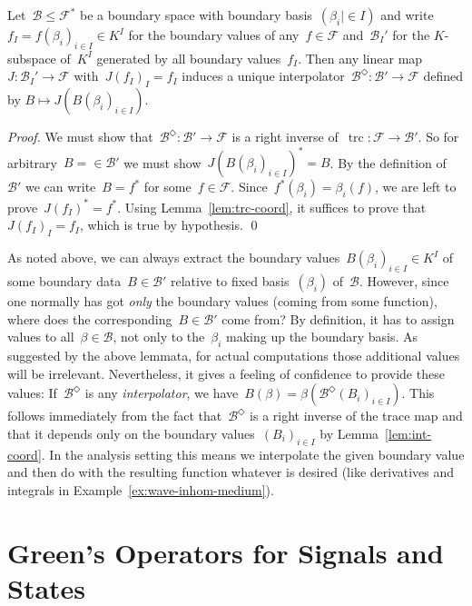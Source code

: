 \documentclass[a4paper]{llncs}
\newcommand{\fri}[1]{#1^\Diamond}
\newcommand{\trc}{\operatorname{trc}}
\newcommand{\galg}{\mathcal{F}}
\newcommand{\bspc}{\mathcal{B}}
\newenvironment{myproof}{\begin{proof}}{\qed\end{proof}}
\begin{document}
\begin{mylemma}
  \label{lem:int-coord}
  Let~$\bspc \le \galg^*$ be a boundary space with boundary
  basis~$(\beta_i \mid \in I)$ and write~$f_I = f(\beta_i)_{i \in I}
  \in K^I$ for the boundary values of any~$f \in \galg$
  and~$\bspc_I'$ for the $K$-subspace of~$K^I$ generated by all
  boundary values~$f_I$. Then any linear map~$J\colon \bspc_I' \to
  \galg$ with~$J(f_I)_I = f_I$ induces a unique
  interpolator~$\fri{\bspc}\colon \bspc' \to \galg$ defined by
  $B \mapsto J(B(\beta_i)_{i \in I})$.
\end{mylemma}
\begin{myproof}
  We must show that~$\fri{\bspc}\colon \bspc' \to \galg$ is a right inverse
  of~$\trc\colon \galg \to \bspc'$. So for arbitrary~$B = \in \bspc'$ we must
  show~$J(B(\beta_i)_{i \in I})^* = B$. By the definition of~$\bspc'$ we can
  write~$B = f^*$ for some~$f \in \galg$. Since~$f^*(\beta_i) = \beta_i(f)$, we
  are left to prove~$J(f_I)^* = f^*$. Using Lemma~\ref{lem:trc-coord}, it
  suffices to prove that~$J(f_I)_I = f_I$, which is true by hypothesis.
\end{myproof}

As noted above, we can always extract the boundary values~$B(\beta_i)_{i \in I}
\in K^I$ of some boundary data~$B \in \bspc'$ relative to fixed
basis~$(\beta_i)$ of~$\bspc$. However, since one normally has got \emph{only}
the boundary values (coming from some function), where does the corresponding~$B
\in \bspc'$ come from? By definition, it has to assign values to all~$\beta \in
\bspc$, not only to the~$\beta_i$ making up the boundary basis. As suggested by
the above lemmata, for actual computations those additional values will be
irrelevant. Nevertheless, it gives a feeling of confidence to provide these
values: If~$\fri{\bspc}$ is any \emph{interpolator}, we have~$B(\beta) =
\beta(\fri{\bspc}(B_i)_{i \in I})$. This follows immediately from the fact
that~$\fri{\bspc}$ is a right inverse of the trace map and that it depends only
on the boundary values~$(B_i)_{i \in I}$ by Lemma~\ref{lem:int-coord}. In the
analysis setting this means we interpolate the given boundary value and then do
with the resulting function whatever is desired (like derivatives and integrals
in Example~\ref{ex:wave-inhom-medium}).


\section{Green's Operators for Signals and States}
\label{sec:greens-operators}
\end{document}

